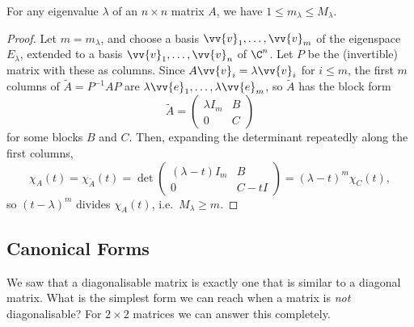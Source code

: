 \begin{proposition}
	For any eigenvalue $\lambda$ of an $n \times n$ matrix $A$, we have $1 \leq m_\lambda \leq M_\lambda$.
\end{proposition}
\begin{proof}
	Let $m = m_\lambda$, and choose a basis $\vv{v}_1, \dots, \vv{v}_m$ of the eigenspace $E_\lambda$, extended to a basis $\vv{v}_1, \dots, \vv{v}_n$ of $\C^n$. Let $P$ be the (invertible) matrix with these as columns. Since $A\vv{v}_i = \lambda \vv{v}_i$ for $i \leq m$, the first $m$ columns of $\tilde{A} = P^{-1}AP$ are $\lambda \vv{e}_1, \dots, \lambda \vv{e}_m$, so $\tilde A$ has the block form
	$$
	\tilde{A} = \begin{pmatrix}
		\lambda I_m & B \\
		0 & C
	\end{pmatrix}
	$$
	for some blocks $B$ and $C$. Then, expanding the determinant repeatedly along the first columns,
	$$
	\chi_A(t) = \chi_{\tilde A}(t) = \det \begin{pmatrix}
		(\lambda - t)I_m & B \\ 0 & C - tI
	\end{pmatrix} = (\lambda - t)^m \chi_C(t),
	$$
	so $(t - \lambda)^m$ divides $\chi_A(t)$, i.e.\ $M_\lambda \geq m$.
\end{proof}

\subsection{Canonical Forms}

We saw that a diagonalisable matrix is exactly one that is similar to a diagonal matrix. What is the simplest form we can reach when a matrix is \emph{not} diagonalisable? For $2 \times 2$ matrices we can answer this completely.

